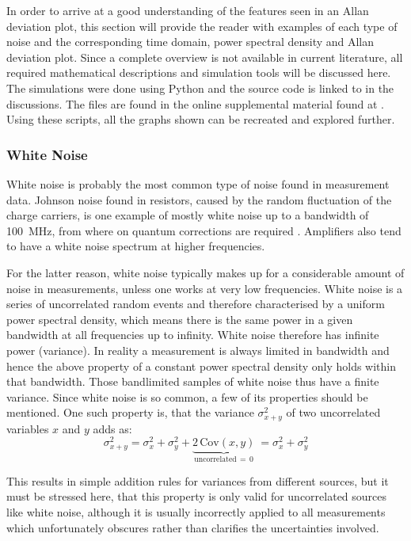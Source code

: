 In order to arrive at a good understanding of the features seen in an Allan deviation plot, this section will provide the reader with examples of each type of noise and the corresponding time domain, power spectral density and Allan deviation plot. Since a complete overview is not available in current literature, all required mathematical descriptions and simulation tools will be discussed here. The simulations were done using Python and the source code is linked to in the discussions. The files are found in the online supplemental material found at \cite{supplemental_material}. Using these scripts, all the graphs shown can be recreated and explored further.

\subsubsection{White Noise}
White noise is probably the most common type of noise found in measurement data. Johnson noise found in resistors, caused by the random fluctuation of the charge carriers, is one example of mostly white noise up to a bandwidth of \qty{100}{\MHz}, from where on quantum corrections are required \cite{nist_johnson_noise}. Amplifiers also tend to have a white noise spectrum at higher frequencies.

For the latter reason, white noise typically makes up for a considerable amount of noise in measurements, unless one works at very low frequencies. White noise is a series of uncorrelated random events and therefore characterised by a uniform power spectral density, which means there is the same power in a given bandwidth at all frequencies up to infinity. White noise therefore has infinite power (variance). In reality a measurement is always limited in bandwidth and hence the above property of a constant power spectral density only holds within that bandwidth. Those bandlimited samples of white noise thus have a finite variance.
Since white noise is so common, a few of its properties should be mentioned. One such property is, that the variance $\sigma_{x+y}^2$ of two uncorrelated variables $x$ and $y$ adds as:
\begin{equation}
    \sigma_{x+y}^2  = \sigma_x^2 + \sigma_y^2 + \underbrace{2\,\mathrm{Cov}(x,y)}_{\text{uncorrelated}\, =\, 0}\ = \sigma_x^2 + \sigma_y^2 \label{eqn:adding_white_noise}
\end{equation}

This results in simple addition rules for variances from different sources, but it must be stressed here, that this property is only valid for uncorrelated sources like white noise, although it is usually incorrectly applied to all measurements which unfortunately obscures rather than clarifies the uncertainties involved.

